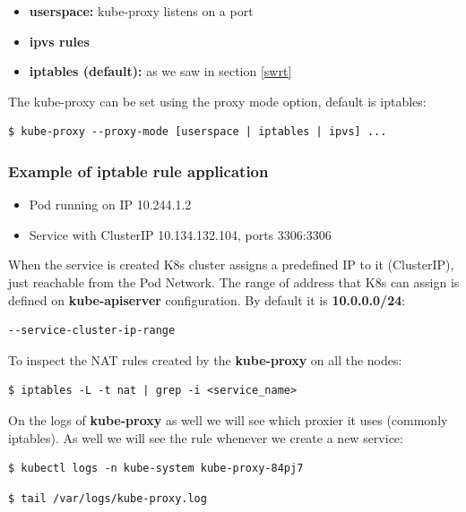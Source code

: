 \documentclass{article}
\newenvironment{codetemplate}[1][]{%
  \mybasecolorbox[#1]
  \itshape
}{%
  \endmybasecolorbox
}
\begin{document}
\begin{itemize}
    \item \textbf{userspace:} kube-proxy listens on a port
    \item \textbf{ipvs rules}
    \item \textbf{iptables (default):} as we saw in section \ref{swrt}
\end{itemize}

The kube-proxy can be set using the proxy mode option, default is iptables:

\begin{codetemplate}{}
\begin{verbatim}
$ kube-proxy --proxy-mode [userspace | iptables | ipvs] ...
\end{verbatim}
\end{codetemplate}

\subsubsection{Example of iptable rule application}
\begin{itemize}
    \item Pod running on IP 10.244.1.2
    \item Service with ClusterIP 10.134.132.104, ports 3306:3306
\end{itemize}

When the service is created K8s cluster assigns a predefined IP to it (ClusterIP), just reachable from the Pod Network. The range of address that K8s can assign is defined on \textbf{kube-apiserver} configuration. By default it is \textbf{10.0.0.0/24}:
\begin{codetemplate}{}
\begin{verbatim}
--service-cluster-ip-range
\end{verbatim}
\end{codetemplate} 

To inspect the NAT rules created by the \textbf{kube-proxy} on all the nodes:
\begin{codetemplate}{}
\begin{verbatim}
$ iptables -L -t nat | grep -i <service_name>
\end{verbatim}
\end{codetemplate}

On the logs of \textbf{kube-proxy} as well we will see which proxier it uses (commonly iptables). As well we will see the rule whenever we create a new service:
\begin{codetemplate}{}
\begin{verbatim}
$ kubectl logs -n kube-system kube-proxy-84pj7
\end{verbatim}
\end{codetemplate}
\begin{codetemplate}{}
\begin{verbatim}
$ tail /var/logs/kube-proxy.log
\end{verbatim}
\end{codetemplate}
\end{document}
